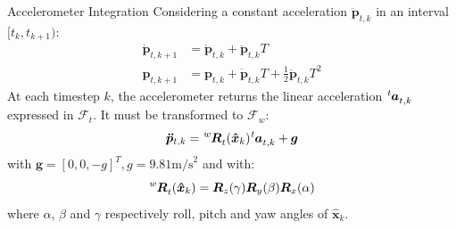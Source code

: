 \documentclass[10pt]{beamer}
\begin{document}

    \begin{frame}{Accelerometer Integration}
        Considering a constant acceleration $\bm{\ddot{p}}_{t, k}$ in an
        interval $[t_k, t_{k+1})$:
        \begin{align*}
            \bm{\dot{p}}_{t, k+1} &= \bm{\dot{p}}_{t, k} + \bm{\ddot{p}}_{t, k} T \\
            \bm{p}_{t, k+1} &= \bm{p}_{t, k} + \bm{\dot{p}}_{t, k} T + \frac{1}{2} \bm{\ddot{p}}_{t, k} T^2
        \end{align*}
        At each timestep $k$, the accelerometer returns the linear acceleration
        $\tensor[^t]{\bm{a}}{_{t,k}}$ expressed in $\mathcal{F}_t$.
        It must be transformed to $\mathcal{F}_w$:
        \begin{equation*}
            \bm{\ddot{p}}_{t,k} = \tensor[^w]{\bm{R}}{_t}(\bm{\hat{x}}_{k}) \tensor[^t]{\bm{a}}{_{t,k}} + \bm{g}
        \end{equation*}
        with $\bm{g} = [0, 0, -g]^T, g = 9.81 \text{m/s}^2$ and with:
        \begin{equation*}
            \tensor[^w]{\bm{R}}{_t}(\bm{\hat{x}}_{k}) = \bm{R}_z(\gamma) \bm{R}_y(\beta) \bm{R}_x(\alpha)
        \end{equation*}
        where $\alpha$, $\beta$ and $\gamma$ respectively
        roll, pitch and yaw angles of $\bm{\hat{x}}_{k}$.
    \end{frame}
\end{document}
